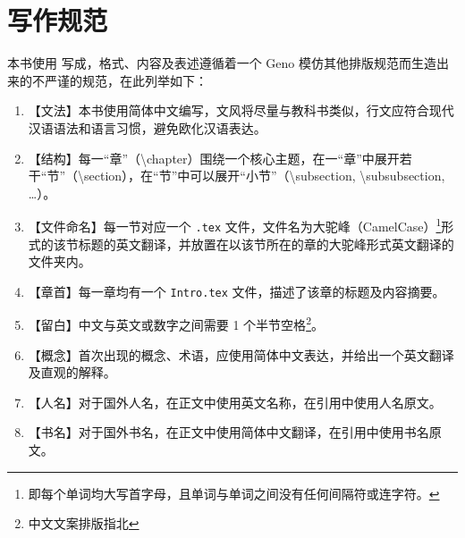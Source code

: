 \section*{写作规范}\label{sec:Preface/WritingGuideline}
    本书使用  写成，格式、内容及表述遵循着一个 Geno 模仿其他排版规范而生造出来的不严谨的规范，在此列举如下：

    \begin{enumerate}
        \item 【文法】本书使用简体中文编写，文风将尽量与教科书类似，行文应符合现代汉语语法和语言习惯，避免欧化汉语表达。
        \item 【结构】每一“章”（\textbackslash chapter）围绕一个核心主题，在一“章”中展开若干“节”（\textbackslash section），在“节”中可以展开“小节”（\textbackslash subsection, \textbackslash subsubsection, \ldots）。
        \item 【文件命名】每一节对应一个 \texttt{.tex} 文件，文件名为大驼峰（CamelCase）\footnote{即每个单词均大写首字母，且单词与单词之间没有任何间隔符或连字符。}形式的该节标题的英文翻译，并放置在以该节所在的章的大驼峰形式英文翻译的文件夹内。
        \item 【章首】每一章均有一个 \texttt{Intro.tex} 文件，描述了该章的标题及内容摘要。
        \item 【留白】中文与英文或数字之间需要 1 个半节空格\footnote{中文文案排版指北\cite{sparanoid-cwg}}。
        \item 【概念】首次出现的概念、术语，应使用简体中文表达，并给出一个英文翻译及直观的解释。
        \item 【人名】对于国外人名，在正文中使用英文名称，在引用中使用人名原文。
        \item 【书名】对于国外书名，在正文中使用简体中文翻译，在引用中使用书名原文。
    \end{enumerate}
